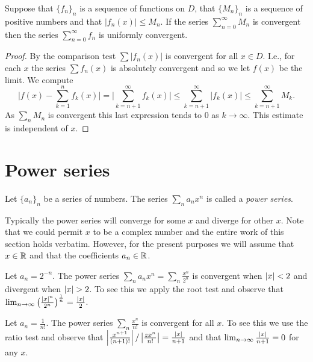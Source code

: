 \begin{theorem}
  Suppose that \({\{f_n\}}_n\) is a sequence of functions on \(D\), that \({\{M_n\}}_n\) is a sequence of positive numbers
  and that \(|f_n(x)|\leq M_n\).
  If the series \(\sum_{n=0}^{\infty}M_n\) is convergent then the series \(\sum_{n=0}^{\infty}f_n\) is uniformly convergent.
\end{theorem}



\begin{proof}
  By the comparison test \(\sum |f_n(x)| \) is convergent for all \(x\in D\).
  I.e., for each \(x\) the series \(\sum f_n(x) \) is absolutely convergent and so we let \(f(x)\) be the limit.
  We compute
  \[
    \Big|f(x) - \sum_{k=1}^{n} f_k(x)  \Big|
    =
    \Big|\sum_{k=n+1}^{\infty} f_k(x)  \Big|
    \leq \sum_{k=n+1}^{\infty} |f_k(x)|
    \leq  \sum_{k=n+1}^{\infty} M_k.
  \]
  As \(\sum_{n}M_n\) is convergent this last expression tends to \(0\) as \(k\to \infty\).
  This estimate is independent of \(x\).
\end{proof}




\section{Power series}



\begin{definition}
  Let \({\{a_n\}}_{n}\) be a series of numbers.
  The series
  \(\sum_{n} a_n x^n\)
  is called a \emph{power series}.
\end{definition}
Typically the power series will converge for some \(x\) and diverge for other \(x\).
Note that we could permit \(x\) to be a complex number and the entire work of this section holds verbatim.
However, for the present purposes we will assume that \(x \in \mathbb{R}\) and that the coefficients \(a_n \in \mathbb{R}\).

\begin{example*}
  Let \(a_n = 2^{-n}\).
  The power series \(\sum_{n} a_n x^n = \sum_{n}\frac{x^n}{2^n}\) is convergent when \(\left|x\right|<2\) and divergent  when \(\left|x\right| > 2\).
  To see this we apply the root test and observe that  \(\lim_{n\to\infty}\big(\frac{\left|x\right|^n}{2^n} \big)^{\frac{1}{n}}=\frac{\left|x\right|}{2}\).
\end{example*}

\begin{example*}
  Let \(a_n = \frac{1}{n!}\).
  The power series \(\sum_{n}\frac{x^n}{n!}\) is convergent for all \(x\).
  To see this we use the ratio test and observe that  \(\left|\frac{x^{n+1}}{(n+1)!} \right|/ \left|\frac{zx^n}{n!}\right| = \frac{\left|x\right|}{n+1}\) and that \(\lim_{n\to\infty} \frac{\left|x\right|}{n+1} = 0 \) for any \(x\).
\end{example*}



